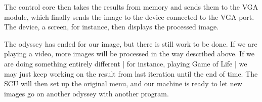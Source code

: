 The control core then takes the results from memory and sends them to the
\ac{VGA} module, which finally sends the image to the device connected to the
\ac{VGA} port. The device, a screen, for instance, then displays the processed
image.

The odyssey has ended for our image, but there is still work to be done. If we
are playing a video, more images will be processed in the way described
above. If we are doing something entirely different | for instance, playing Game
of Life | we may just keep working on the result from last iteration until the
end of time. The \ac{SCU} will then set up the original menu, and
our machine is ready to let new images go on another odyssey with another
program.

